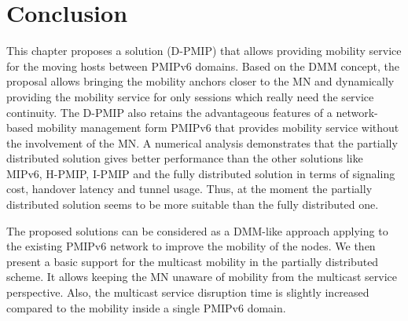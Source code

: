 \section{Conclusion} \label{ch9:conclusion}
This chapter proposes a solution (D-PMIP) that allows providing mobility service for the moving hosts between PMIPv6 domains. Based on the DMM concept, the proposal allows bringing the mobility anchors closer to the MN and dynamically providing the mobility service for only sessions which really need the service continuity. The D-PMIP also retains the advantageous features of a network-based mobility management form PMIPv6 that provides mobility service without the involvement of the MN. A numerical analysis demonstrates that the partially distributed solution gives better performance than the other solutions like MIPv6, H-PMIP, I-PMIP and the fully distributed solution in terms of signaling cost, handover latency and tunnel usage. Thus, at the moment the partially distributed solution seems to be more suitable than the fully distributed one. 

The proposed solutions can be considered as a DMM-like approach applying to the existing PMIPv6 network to improve the mobility of the nodes. We then present a basic support for the multicast mobility in the partially distributed scheme. It allows keeping the MN unaware of mobility from the multicast service perspective. Also, the multicast service disruption time is slightly increased compared to the mobility inside a single PMIPv6 domain. 
